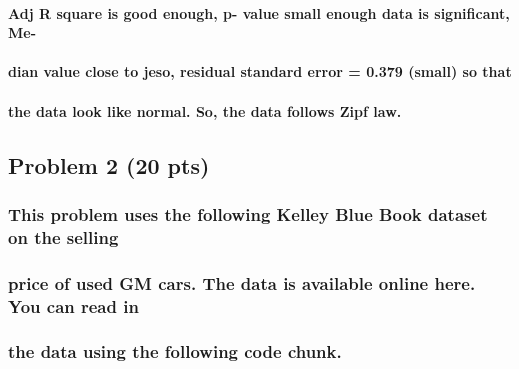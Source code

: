 \documentclass[
]{article}
\begin{document}
\hypertarget{adj-r-square-is-good-enough-p--value-small-enough-data-is-significant-me-}{%
\paragraph{Adj R square is good enough, p- value small enough data is
significant,
Me-}\label{adj-r-square-is-good-enough-p--value-small-enough-data-is-significant-me-}}

\hypertarget{dian-value-close-to-jeso-residual-standard-error-0.379-small-so-that}{%
\paragraph{dian value close to jeso, residual standard error = 0.379
(small) so
that}\label{dian-value-close-to-jeso-residual-standard-error-0.379-small-so-that}}

\hypertarget{the-data-look-like-normal.-so-the-data-follows-zipf-law.}{%
\paragraph{the data look like normal. So, the data follows Zipf
law.}\label{the-data-look-like-normal.-so-the-data-follows-zipf-law.}}

\hypertarget{problem-2-20-pts}{%
\subsection{Problem 2 (20 pts)}\label{problem-2-20-pts}}

\hypertarget{this-problem-uses-the-following-kelley-blue-book-dataset-on-the-selling}{%
\subsubsection{This problem uses the following Kelley Blue Book dataset
on the
selling}\label{this-problem-uses-the-following-kelley-blue-book-dataset-on-the-selling}}

\hypertarget{price-of-used-gm-cars.-the-data-is-available-online-here.-you-can-read-in}{%
\subsubsection{price of used GM cars. The data is available online here.
You can read
in}\label{price-of-used-gm-cars.-the-data-is-available-online-here.-you-can-read-in}}

\hypertarget{the-data-using-the-following-code-chunk.}{%
\subsubsection{the data using the following code
chunk.}\label{the-data-using-the-following-code-chunk.}}
\end{document}
